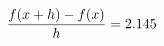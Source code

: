 \documentclass[preview]{standalone}
\begin{document}
\begin{align*}
\special{dvisvgm:raw <g id='unique000'>}\frac{f(x+h)-f(x)}{h} = 2.145\special{dvisvgm:raw </g>}
\end{align*}
\end{document}
